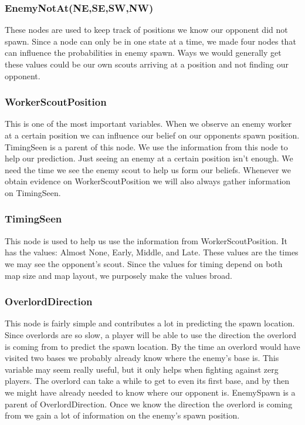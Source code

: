 \subsubsection*{EnemyNotAt(NE,SE,SW,NW)}
These nodes are used to keep track of positions we know our opponent did not spawn. Since a node can only be in one state at a time, we made four nodes that can influence the probabilities in enemy spawn. Ways we would generally get these values could be our own scouts arriving at a position and not finding our opponent.

\subsubsection*{WorkerScoutPosition} This is one of the most important variables. When we observe an enemy worker at a certain position we can influence our belief on our opponents spawn position. TimingSeen is a parent of this node. We use the information from this node to help our prediction. Just seeing an enemy at a certain position isn't enough. We need the time we see the enemy scout to help us form our beliefs. Whenever we obtain evidence on WorkerScoutPosition we will also always gather information on TimingSeen.

\subsubsection*{TimingSeen} This node is used to help us use the information from WorkerScoutPosition. It has the values: Almost None, Early, Middle, and Late. These values are the times we may see the opponent's scout. Since the values for timing depend on both map size and map layout, we purposely make the values broad.


\subsubsection*{OverlordDirection} This node is fairly simple and contributes a lot in predicting the spawn location. Since overlords are so slow, a player will be able to use the direction the overlord is coming from to predict the spawn location. By the time an overlord would have visited two bases we probably already know where the enemy's base is. This variable may seem really useful, but it only helps when fighting against zerg players. The overlord can take a while to get to even its first base, and by then we might have already needed to know where our opponent is. EnemySpawn is a parent of OverlordDirection. Once we know the direction the overlord is coming from we gain a lot of information on the enemy's spawn position.

